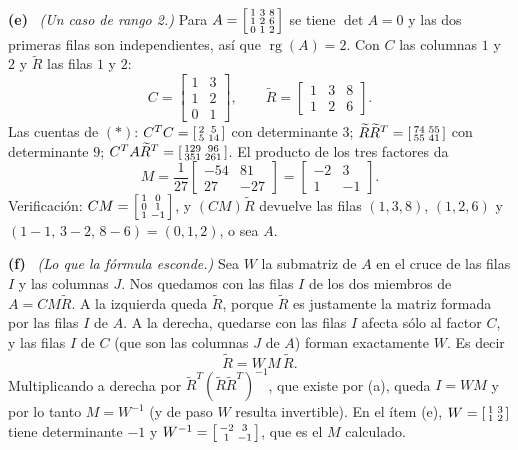 \documentclass[11pt,a4paper]{article}
\DeclareMathOperator{\rg}{rg}
\newcommand{\itemsol}[1]{\par\medskip\noindent\textbf{(#1)}\ \ignorespaces}
\begin{document}
\itemsol{e} \emph{(Un caso de rango 2.)} Para
$A=\begin{bsmallmatrix}1&3&8\\1&2&6\\0&1&2\end{bsmallmatrix}$ se tiene
$\det A=0$ y las dos primeras filas son independientes, así que $\rg(A)=2$. Con
$C$ las columnas $1$ y $2$ y $\widetilde R$ las filas $1$ y $2$:
\[
C=\begin{bmatrix}1&3\\1&2\\0&1\end{bmatrix},\qquad
\widetilde R=\begin{bmatrix}1&3&8\\1&2&6\end{bmatrix}.
\]
Las cuentas de $(*)$: $C^TC=\begin{bsmallmatrix}2&5\\5&14\end{bsmallmatrix}$ con
determinante $3$; $\widetilde R\widetilde R^T
=\begin{bsmallmatrix}74&55\\55&41\end{bsmallmatrix}$ con determinante $9$;
$C^TA\widetilde R^T=\begin{bsmallmatrix}129&96\\351&261\end{bsmallmatrix}$. El
producto de los tres factores da
\[
M=\frac{1}{27}\begin{bmatrix}-54&81\\27&-27\end{bmatrix}
 =\begin{bmatrix}-2&3\\1&-1\end{bmatrix}.
\]
Verificación: $CM=\begin{bsmallmatrix}1&0\\0&1\\1&-1\end{bsmallmatrix}$, y
$(CM)\widetilde R$ devuelve las filas $(1,3,8)$, $(1,2,6)$ y
$(1-1,\,3-2,\,8-6)=(0,1,2)$, o sea $A$.

\itemsol{f} \emph{(Lo que la fórmula esconde.)} Sea $W$ la submatriz de $A$ en
el cruce de las filas $I$ y las columnas $J$. Nos quedamos con las filas $I$ de
los dos miembros de $A=CM\widetilde R$. A la izquierda queda $\widetilde R$,
porque $\widetilde R$ es justamente la matriz formada por las filas $I$ de $A$.
A la derecha, quedarse con las filas $I$ afecta sólo al factor $C$, y las filas
$I$ de $C$ (que son las columnas $J$ de $A$) forman exactamente $W$. Es decir
\[
\widetilde R=W\,M\,\widetilde R .
\]
Multiplicando a derecha por
$\widetilde R^T(\widetilde R\widetilde R^T)^{-1}$, que existe por (a), queda
$I=WM$ y por lo tanto $\boxed{M=W^{-1}}$ (y de paso $W$ resulta invertible). En
el ítem (e), $W=\begin{bsmallmatrix}1&3\\1&2\end{bsmallmatrix}$ tiene
determinante $-1$ y $W^{-1}=\begin{bsmallmatrix}-2&3\\1&-1\end{bsmallmatrix}$,
que es el $M$ calculado.
\end{document}
